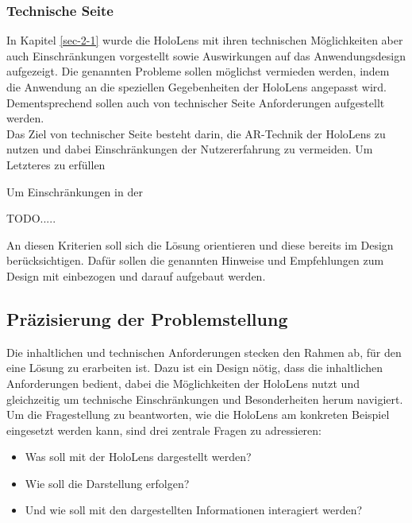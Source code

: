\subsubsection{Technische Seite}
In Kapitel \ref{sec-2-1} wurde die HoloLens mit ihren technischen Möglichkeiten aber auch Einschränkungen vorgestellt sowie Auswirkungen auf das Anwendungsdesign aufgezeigt. Die genannten Probleme sollen möglichst vermieden werden, indem die Anwendung an die speziellen Gegebenheiten der HoloLens angepasst wird. Dementsprechend sollen auch von technischer Seite Anforderungen aufgestellt werden.\\

Das Ziel von technischer Seite besteht darin, die AR-Technik der HoloLens zu nutzen und dabei Einschränkungen der Nutzererfahrung zu vermeiden. Um Letzteres zu erfüllen 

Um Einschränkungen in der

TODO.....

An diesen Kriterien soll sich die Lösung orientieren und diese bereits im Design berücksichtigen. Dafür sollen die genannten Hinweise und Empfehlungen zum Design mit einbezogen und darauf aufgebaut werden.\\

\subsection{Präzisierung der Problemstellung}
\label{sec-3-2}
Die inhaltlichen und technischen Anforderungen stecken den Rahmen ab, für den eine Lösung zu erarbeiten ist. Dazu ist ein Design nötig, dass die inhaltlichen Anforderungen bedient, dabei die Möglichkeiten der HoloLens nutzt und gleichzeitig um technische Einschränkungen und Besonderheiten herum navigiert. Um die Fragestellung zu beantworten, wie die HoloLens am konkreten Beispiel eingesetzt werden kann, sind drei zentrale Fragen zu adressieren:
\begin{itemize}
	\setlength{\itemsep}{-5pt}
	\item Was soll mit der HoloLens dargestellt werden?
	\item Wie soll die Darstellung erfolgen?
	\item Und wie soll mit den dargestellten Informationen interagiert werden?
\end{itemize}

